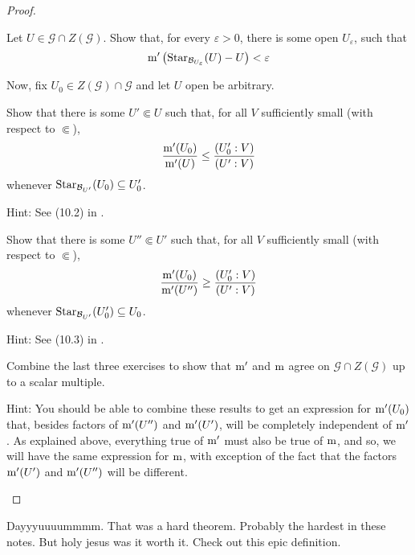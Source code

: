\begin{thm}
\begin{proof}
\begin{exr}
Let $U\in \mathcal{G}\cap Z(\mathcal{G})$.  Show that, for every $\varepsilon >0$, there is some open $U_\varepsilon$, such that
\begin{equation}
\mathrm{m} '\left( \operatorname{Star} _{\mathcal{B}_{U_{\varepsilon}}}(U)-U\right) <\varepsilon 
\end{equation}
\end{exr}
Now, fix $U_0\in Z(\mathcal{G})\cap \mathcal{G}$ and let $U$ open be arbitrary.
\begin{exr}
Show that there is some $U'\Subset U$ such that, for all $V$ sufficiently small (with respect to $\Subset$),
\begin{equation}
\frac{\mathrm{m} '(U_0)}{\mathrm{m} '(U)}\leq \frac{(U_0':V)}{(U':V)}
\end{equation}
whenever $\operatorname{Star} _{\mathcal{B}_{U'}}(U_0)\subseteq U_0'$.
\begin{rmk}
Hint:  See (10.2) in \cite{Howes}.
\end{rmk}
\end{exr}
\begin{exr}
Show that there is some $U''\Subset U'$ such that, for all $V$ sufficiently small (with respect to $\Subset$),
\begin{equation}
\frac{\mathrm{m} '(U_0)}{\mathrm{m} '(U'')}\geq \frac{(U_0':V)}{(U':V)}
\end{equation}
whenever $\operatorname{Star} _{\mathcal{B}_{U'}}(U_0')\subseteq U_0$.
\begin{rmk}
Hint:  See (10.3) in \cite{Howes}.
\end{rmk}
\end{exr}
\begin{exr}
Combine the last three exercises to show that $\mathrm{m} '$ and $\mathrm{m}$ agree on $\mathcal{G}\cap Z(\mathcal{G})$ up to a scalar multiple.
\begin{rmk}
Hint:  You should be able to combine these results to get an expression for $\mathrm{m} '(U_0)$ that, besides factors of $\mathrm{m} '(U'')$ and $\mathrm{m} '(U')$, will be completely independent of $\mathrm{m} '$.  As explained above, everything true of $\mathrm{m} '$ must also be true of $\mathrm{m}$, and so, we will have the same expression for $\mathrm{m}$, with exception of the fact that the factors $\mathrm{m} '(U')$ and $\mathrm{m} '(U'')$ will be different.
\end{rmk}
\end{exr}
\end{proof}
\end{thm}
Dayyyuuuummmm.  That was a hard theorem.  Probably the hardest in these notes.  But holy jesus was it worth it.  Check out this epic definition.
